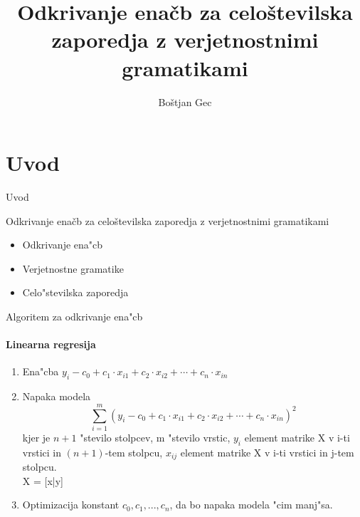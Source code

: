 \documentclass[t,usenames,dvipsnames]{beamer} %
\title{Odkrivanje enačb za celoštevilska zaporedja z verjetnostnimi gramatikami}
\author{Boštjan Gec}
\institute{mentor: prof. dr. Ljupčo Todorovski}
\begin{document}
\begin{frame}
  \maketitle
\end{frame}


\section{Uvod}

\begin{frame}{Uvod}
	\begin{block}{Odkrivanje enačb za celoštevilska zaporedja z verjetnostnimi gramatikami}
	\begin{itemize}
		\item Odkrivanje ena"cb
		\item Verjetnostne gramatike
		\item Celo"stevilska zaporedja
	\end{itemize}
	\end{block}
\end{frame}

\begin{frame}{Algoritem za odkrivanje ena"cb}
\framesubtitle{Linearna regresija}
\pause
{}
\pause
	\begin{enumerate}[<+->]
		\item Ena"cba \(y _i - c_0 + c_1\cdot x_{i1}  +
		c_2\cdot x_{i2}+ \cdots + c_n\cdot x_{in}  \)
	\item Napaka modela \[ \sum_{i=1} ^m (y _i - c_0 + c_1\cdot x_{i1}  +
		c_2\cdot x_{i2}+ \cdots + c_n\cdot x_{in} )^2
		\]
kjer je $n+1$ "stevilo stolpcev, m "stevilo vrstic, $y_i$ element matrike X v i-ti vrstici
in $(n+1)$-tem stolpcu, $x_{ij}$ element matrike X v i-ti vrstici in j-tem stolpcu.\\
		X = [x|y]
		\item Optimizacija konstant \( c_0, c_1, ..., c_n \), da bo
		napaka modela "cim manj"sa.
	\end{enumerate}
\end{frame}

\end{document}
